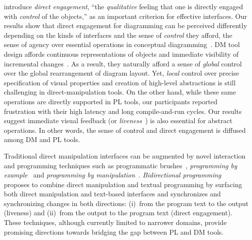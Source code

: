 \citet{DM-Seminal} introduce \emph{direct engagement}, ``the \emph{qualitative} feeling that one is directly engaged with \emph{control} of the objects,'' as an important criterion for effective interfaces. Our results show that direct engagement for diagramming can be perceived differently depending on the kinds of interfaces and the sense of \emph{control} they afford, \ie{} the sense of agency over essential operations in conceptual diagramming~\cite{senseOfAgency}. DM tool design affords continuous representations of objects and immediate visibility of incremental changes~\cite{DirectManipulation-Shneiderman}. As a result, they naturally afford a sense of \emph{global} control over the global rearrangement of diagram layout. Yet, \emph{local} control over precise specification of visual properties and creation of high-level abstractions is still challenging in direct-manipulation tools. On the other hand, while these same operations are directly supported in PL tools, our participants reported frustration with their high latency and long compile-and-run cycles. Our results suggest immediate visual feedback (or \textit{liveness}~\cite{Viva-Liveness}) is also essential for abstract operations. In other words, the sense of control and direct engagement is diffused among DM and PL tools.


Traditional direct manipulation interfaces can be augmented by novel interaction and programming techniques such as programmatic brushes~\cite{dynamicBrushes}, \emph{programming by example}~\cite{PBEExcel} and \emph{programming by manipulation}~\cite{PBMLayout}. \emph{Bidirectional programming}~\cite{prodirectVision} proposes to combine direct manipulation and textual programming by surfacing both direct manipulation and text-based interfaces and synchronizes and synchronizing changes in both directions: (i)~from the program text to the output (liveness) and (ii)~from the output to the program text (direct engagement). These techniques, although currently limited to narrower domains, provide promising directions towards bridging the gap between PL and DM tools.

